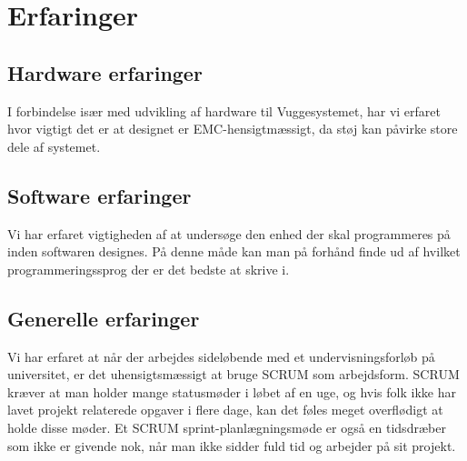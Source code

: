 \chapter{Erfaringer}

\section{Hardware erfaringer}
I forbindelse især med udvikling af hardware til Vuggesystemet, har vi erfaret hvor vigtigt det er at designet er EMC-hensigtmæssigt, da støj kan påvirke store dele af systemet. 


\section{Software erfaringer}
Vi har erfaret vigtigheden af at undersøge den enhed der skal programmeres på inden softwaren designes. På denne måde kan man på forhånd finde ud af hvilket programmeringssprog der er det bedste at skrive i. 

\section{Generelle erfaringer}

Vi har erfaret at når der arbejdes sideløbende med et undervisningsforløb på universitet, er det uhensigtsmæssigt at bruge SCRUM som arbejdsform. SCRUM kræver at man holder mange statusmøder i løbet af en uge, og hvis folk ikke har lavet projekt relaterede opgaver i flere dage, kan det føles meget overflødigt at holde disse møder. Et SCRUM sprint-planlægningsmøde er også en tidsdræber som ikke er givende nok, når man ikke sidder fuld tid og arbejder på sit projekt.

